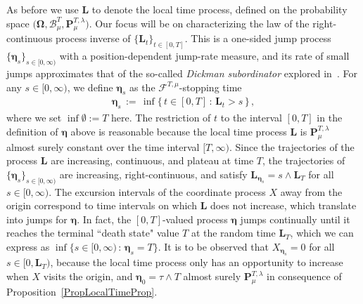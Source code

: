 \documentclass[10pt]{article}
\numberwithin{equation}{section}
\theoremstyle{definition}
\begin{document}
As before we use $\mathbf{L}$ to denote the local time process, defined on the probability space  $\big( \boldsymbol{\Omega},\mathscr{B}_{\mu}^T,  \mathbf{P}_{\mu}^{T,\lambda} \big)$.  Our focus  will be on characterizing the law of the right-continuous process inverse of $\{\mathbf{L}_t\}_{t\in [0,T]}$.  This  is a one-sided jump process $\{ \boldsymbol{\eta}_s \}_{s\in [0,\infty)} $ with a position-dependent jump-rate  measure, and its rate of  small jumps  approximates that of  the so-called \textit{Dickman subordinator} explored in~\cite{CSZ2}.  For any $s\in [0,\infty)$, we define $\boldsymbol{\eta}_s$ as the $\mathscr{F}^{T,\mu}$-stopping time
\begin{align}\label{ETA}
\boldsymbol{\eta}_s\,:=\,\inf\big\{\, t\in [0,T]  \,:\,\mathbf{L}_t >  s \,\big\} \,, 
\end{align}
where we set $\inf \emptyset :=T$ here. The  restriction of $t$ to the interval $ [0,T]$  in the definition of $\boldsymbol{\eta}$ above is reasonable because the local time process $\mathbf{L}$ is $\mathbf{P}_{\mu}^{T,\lambda }$ almost surely  constant over the time interval $[T,\infty)$.  Since the trajectories of the process $\mathbf{L}$ are increasing, continuous, and plateau at time $T$, the trajectories of  $\{\boldsymbol{\eta}_s\}_{s\in [0,\infty)}$ are increasing, right-continuous, and satisfy $\mathbf{L}_{\boldsymbol{\eta}_s}=s\wedge \mathbf{L}_T$ for all $s\in [0,\infty)$.   The excursion intervals of the coordinate process $X$ away from the origin correspond to time intervals on which  $\mathbf{L} $ does not increase, which translate into jumps for $\boldsymbol{\eta}$.  In fact, the  $[0,T]$-valued process $\boldsymbol{\eta}$ jumps continually until it reaches the terminal ``death state" value $T$ at the random time $\mathbf{L}_T$,  which we can express as $\inf\{ s\in [0,\infty)\,:\, \boldsymbol{\eta}_s=T\}$.  It is to be observed  that $X_{\boldsymbol{\eta}_s}=0$ for all $s\in [0,\mathbf{L}_T)$, because the local time process only has an opportunity to increase when $X$ visits the origin, and $\boldsymbol{\eta}_0=\tau \wedge T$ almost surely $ \mathbf{P}_{\mu}^{T,\lambda}$ in consequence of Proposition~\ref{PropLocalTimeProp}.
\end{document}
